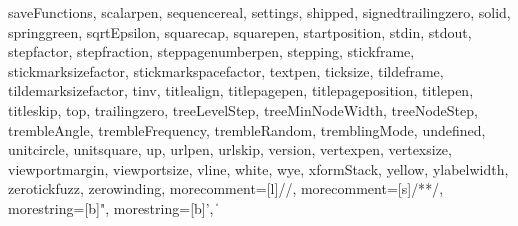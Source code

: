 {{  saveFunctions, scalarpen, sequencereal, settings, shipped,
  signedtrailingzero, solid, springgreen, sqrtEpsilon, squarecap, squarepen,
  startposition, stdin, stdout, stepfactor, stepfraction, steppagenumberpen,
  stepping, stickframe, stickmarksizefactor, stickmarkspacefactor, textpen,
  ticksize, tildeframe, tildemarksizefactor, tinv, titlealign, titlepagepen,
  titlepageposition, titlepen, titleskip, top, trailingzero, treeLevelStep,
  treeMinNodeWidth, treeNodeStep, trembleAngle, trembleFrequency,
  trembleRandom, tremblingMode, undefined, unitcircle, unitsquare, up,
  urlpen, urlskip, version, vertexpen, vertexsize, viewportmargin,
  viewportsize, vline, white, wye, xformStack, yellow, ylabelwidth,
  zerotickfuzz, zerowinding},
  morecomment=[l]{//},%
  morecomment=[s]{/*}{*/},%
  morestring=[b]",%
  morestring=[b]',%
}
%
%
\def\oldvert{|} %
\lstMakeShortInline[style=lesscolor]\|

\def\inlinecode{\expandafter\lstinline[style=lesscolor]}

\endinput

